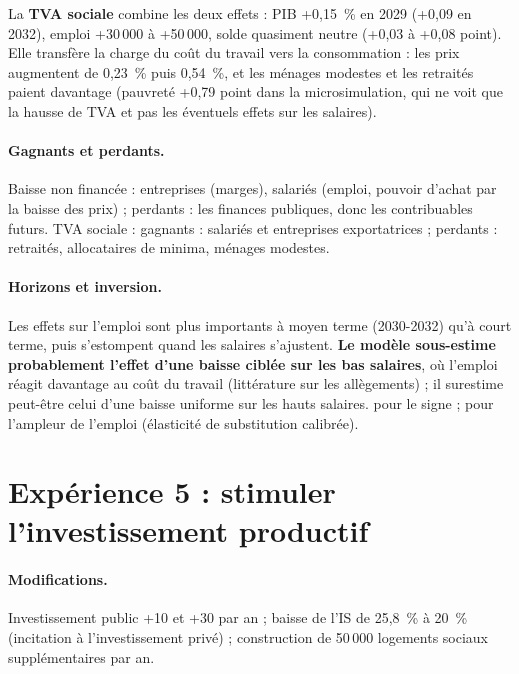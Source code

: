 La \textbf{TVA sociale} combine les deux effets : PIB +0,15~\% en 2029 (+0,09 en 2032), emploi +30\,000 à +50\,000,
solde quasiment neutre (+0,03 à +0,08 point). Elle transfère la charge du coût du travail vers la consommation : les
prix augmentent de 0,23~\% puis 0,54~\%, et les ménages modestes et les retraités paient davantage (pauvreté +0,79 point
dans la microsimulation, qui ne voit que la hausse de TVA et pas les éventuels effets sur les salaires).

\paragraph{Gagnants et perdants.} Baisse non financée : entreprises (marges), salariés (emploi, pouvoir d'achat par la
baisse des prix) ; perdants : les finances publiques, donc les contribuables futurs. TVA sociale : gagnants : salariés
et entreprises exportatrices ; perdants : retraités, allocataires de minima, ménages modestes.

\paragraph{Horizons et inversion.} Les effets sur l'emploi sont plus importants à moyen terme (2030-2032) qu'à court
terme, puis s'estompent quand les salaires s'ajustent. \textbf{Le modèle sous-estime probablement l'effet d'une baisse
ciblée sur les bas salaires}, où l'emploi réagit davantage au coût du travail (littérature sur les allègements) ; il
surestime peut-être celui d'une baisse uniforme sur les hauts salaires.  pour le signe ;
 pour l'ampleur de l'emploi (élasticité de substitution calibrée).

\section{Expérience 5 : stimuler l'investissement productif}
\label{sec:exp5}

\paragraph{Modifications.} Investissement public +10\md{} et +30\md{} par an ; baisse de l'IS de 25,8~\% à 20~\%
(incitation à l'investissement privé) ; construction de 50\,000 logements sociaux supplémentaires par an.

\begin{table}[htbp]
\centering\scriptsize
\caption{Expérience 5 — Investissement public et privé.}
\label{tab:invest}
\\[4pt]
\end{table}

